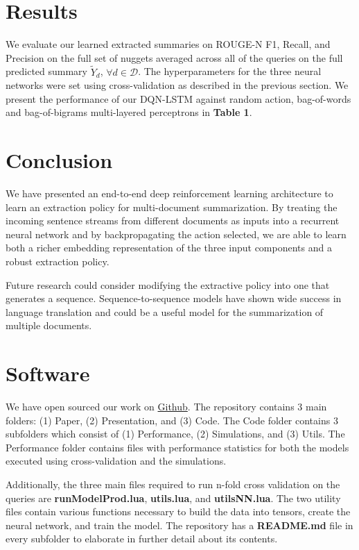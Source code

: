 \documentclass[12pt]{article}
\begin{document}
\section{Results}
We evaluate our learned extracted summaries on ROUGE-N F1, Recall, and Precision on the full set of nuggets averaged across all of the queries on the full predicted summary $\tilde{Y}_d$, $\forall d \in \mathcal{D}$. The hyperparameters for the three neural networks were set using cross-validation as described in the previous section. We present the performance of our DQN-LSTM against random action, bag-of-words and bag-of-bigrams multi-layered perceptrons in \textbf{Table 1}. 

\section{Conclusion}
We have presented an end-to-end deep reinforcement learning architecture to learn an extraction policy for multi-document summarization. By treating the incoming sentence streams from different documents as inputs into a recurrent neural network and by backpropagating the action selected, we are able to learn both a richer embedding representation of the three input components and a robust extraction policy. 

Future research could consider modifying the extractive policy into one that generates a sequence. Sequence-to-sequence models \cite{sutskever2014sequence} have shown wide success in language translation and could be a useful model for the summarization of multiple documents.

\section{Software}

We have open sourced our work on \href{https://github.com/franciscojavierarceo/DQN-Event-Summarization}{Github}. The repository contains 3 main folders: (1) Paper, (2) Presentation, and (3) Code. The Code folder contains 3 subfolders which consist of (1) Performance, (2) Simulations, and (3) Utils. The Performance folder contains files with performance statistics for both the models executed using cross-validation and the simulations. 

Additionally, the three main files required to run n-fold cross validation on the queries are \textbf{runModelProd.lua}, \textbf{utils.lua}, and \textbf{utilsNN.lua}. The two utility files contain various functions necessary to build the data into tensors, create the neural network, and train the model. The repository has a \textbf{README.md} file in every subfolder to elaborate in further detail about its contents.


\end{document}
